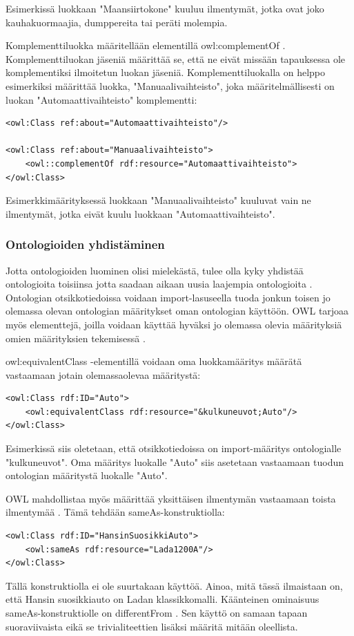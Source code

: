 \documentclass[finnish]{tktltiki2}
\theoremstyle{definition}
\theoremstyle{remark}
\begin{document}
 Esimerkissä luokkaan "Maansiirtokone" kuuluu ilmentymät, jotka ovat joko kauhakuormaajia, dumppereita tai peräti molempia.
 
Komplementtiluokka määritellään elementillä owl:complementOf  \cite{SWM04}. Komplementtiluokan jäseniä määrittää se, että ne eivät missään tapauksessa ole komplementiksi ilmoitetun luokan jäseniä. Komplementtiluokalla on helppo esimerkiksi määrittää luokka, "Manuaalivaihteisto", joka määritelmällisesti on luokan "Automaattivaihteisto" komplementti:
\begin{verbatim}
<owl:Class ref:about="Automaattivaihteisto"/>

<owl:Class ref:about="Manuaalivaihteisto">
    <owl::complementOf rdf:resource="Automaattivaihteisto">
</owl:Class>
\end{verbatim}
Esimerkkimäärityksessä luokkaan "Manuaalivaihteisto" kuuluvat vain ne ilmentymät, jotka eivät kuulu luokkaan "Automaattivaihteisto". 

\subsubsection{Ontologioiden yhdistäminen}
Jotta ontologioiden luominen olisi mielekästä, tulee olla kyky yhdistää ontologioita toisiinsa jotta saadaan aikaan uusia laajempia ontologioita \cite{SWM04}.  Ontologian otsikkotiedoissa voidaan import-lasuseella tuoda jonkun toisen jo olemassa olevan ontologian määritykset oman ontologian käyttöön. OWL tarjoaa myös elementtejä, joilla voidaan käyttää hyväksi jo olemassa olevia määrityksiä omien määrityksien tekemisessä \cite{SWM04}. 

owl:equivalentClass -elementillä voidaan oma luokkamääritys määrätä vastaamaan jotain olemassaolevaa määritystä: 
\begin{verbatim}
<owl:Class rdf:ID="Auto">
    <owl:equivalentClass rdf:resource="&kulkuneuvot;Auto"/>
</owl:Class>
\end{verbatim}
Esimerkissä siis oletetaan, että otsikkotiedoissa on import-määritys ontologialle "kulkuneuvot". Oma määritys luokalle "Auto" siis asetetaan vastaamaan tuodun ontologian määritystä luokalle "Auto". 

OWL mahdollistaa myös määrittää yksittäisen ilmentymän vastaamaan toista ilmentymää \cite{SWM04}. Tämä tehdään sameAs-konstruktiolla: 
\begin{verbatim}
<owl:Class rdf:ID="HansinSuosikkiAuto">
    <owl:sameAs rdf:resource="Lada1200A"/>
</owl:Class>
\end{verbatim}
Tällä konstruktiolla ei ole suurtakaan käyttöä. Ainoa, mitä tässä ilmaistaan on, että Hansin suosikkiauto on Ladan klassikkomalli. Käänteinen ominaisuus sameAs-konstruktiolle on differentFrom \cite{SWM04}. Sen käyttö on samaan tapaan suoraviivaista eikä se trivialiteettien lisäksi määritä mitään oleellista. 
\end{document}
